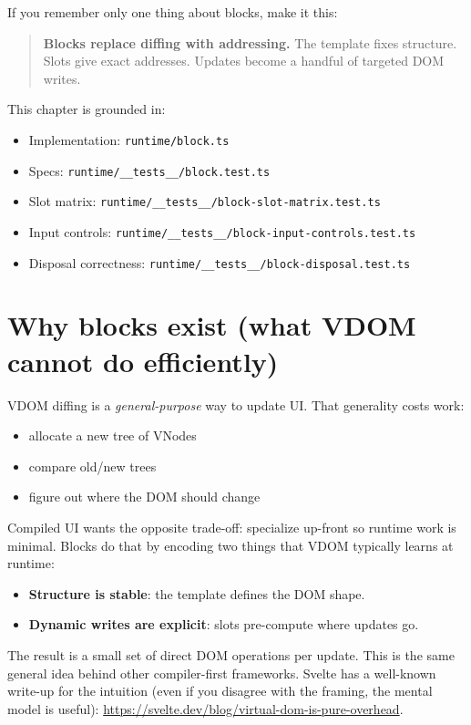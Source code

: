 If you remember only one thing about blocks, make it this:

\begin{quote}
	\textbf{Blocks replace diffing with addressing.} The template fixes structure. Slots give exact addresses. Updates become a handful of targeted DOM writes.
\end{quote}

This chapter is grounded in:

\begin{itemize}
  \item Implementation: \texttt{runtime/block.ts}
  \item Specs: \texttt{runtime/\_\_tests\_\_/block.test.ts}
  \item Slot matrix: \texttt{runtime/\_\_tests\_\_/block-slot-matrix.test.ts}
  \item Input controls: \texttt{runtime/\_\_tests\_\_/block-input-controls.test.ts}
  \item Disposal correctness: \texttt{runtime/\_\_tests\_\_/block-disposal.test.ts}
\end{itemize}

\section{Why blocks exist (what VDOM cannot do efficiently)}

VDOM diffing is a \emph{general-purpose} way to update UI.
That generality costs work:

\begin{itemize}
  \item allocate a new tree of VNodes
  \item compare old/new trees
  \item figure out where the DOM should change
\end{itemize}

Compiled UI wants the opposite trade-off: specialize up-front so runtime work is minimal.
Blocks do that by encoding two things that VDOM typically learns at runtime:

\begin{itemize}
  \item \textbf{Structure is stable}: the template defines the DOM shape.
  \item \textbf{Dynamic writes are explicit}: slots pre-compute where updates go.
\end{itemize}

The result is a small set of direct DOM operations per update.
This is the same general idea behind other compiler-first frameworks.
Svelte has a well-known write-up for the intuition (even if you disagree with the framing, the mental model is useful):
\href{https://svelte.dev/blog/virtual-dom-is-pure-overhead}{https://svelte.dev/blog/virtual-dom-is-pure-overhead}.

